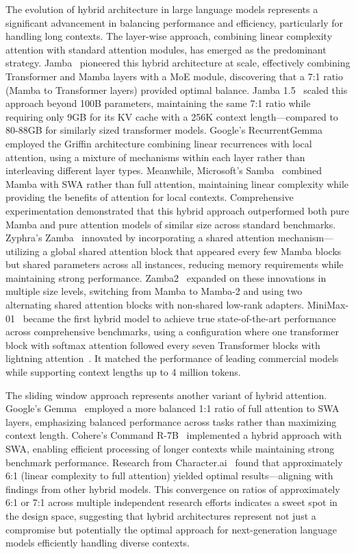 \documentclass[11pt, a4paper, logo, copyright, nonumbering]{map}
\begin{document}
The evolution of hybrid architecture in large language models represents a significant advancement in balancing performance and efficiency, particularly for handling long contexts. The layer-wise approach, combining linear complexity attention with standard attention modules, has emerged as the predominant strategy. Jamba~\cite{lieber2024jamba} pioneered this hybrid architecture at scale, effectively combining Transformer and Mamba layers with a MoE module, discovering that a 7:1 ratio (Mamba to Transformer layers) provided optimal balance. Jamba 1.5~\cite{team2024jamba} scaled this approach beyond 100B parameters, maintaining the same 7:1 ratio while requiring only 9GB for its KV cache with a 256K context length—compared to 80-88GB for similarly sized transformer models.
Google's RecurrentGemma~\cite{recurrentgemma} employed the Griffin architecture combining linear recurrences with local attention, using a mixture of mechanisms within each layer rather than interleaving different layer types. Meanwhile, Microsoft's Samba~\cite{ren2024sambasimplehybridstate} combined Mamba with SWA rather than full attention, maintaining linear complexity while providing the benefits of attention for local contexts. Comprehensive experimentation demonstrated that this hybrid approach outperformed both pure Mamba and pure attention models of similar size across standard benchmarks.
Zyphra's Zamba~\cite{glorioso2024zamba} innovated by incorporating a shared attention mechanism—utilizing a global shared attention block that appeared every few Mamba blocks but shared parameters across all instances, reducing memory requirements while maintaining strong performance. Zamba2~\cite{glorioso2024zamba2} expanded on these innovations in multiple size levels, switching from Mamba to Mamba-2 and using two alternating shared attention blocks with non-shared low-rank adapters.
MiniMax-01~\cite{minimax2025minimax01scalingfoundationmodels} became the first hybrid model to achieve true state-of-the-art performance across comprehensive benchmarks, using a configuration where one transformer block with softmax attention followed every seven Transformer blocks with lightning attention~\citep{qin2024variouslengthsconstantspeed}. It matched the performance of leading commercial models while supporting context lengths up to 4 million tokens.

The sliding window approach represents another variant of hybrid attention. Google's Gemma~\cite{team2024gemma} employed a more balanced 1:1 ratio of full attention to SWA layers, emphasizing balanced performance across tasks rather than maximizing context length. Cohere's Command R-7B~\cite{c4ai-command-r7b-12-2024} implemented a hybrid approach with SWA, enabling efficient processing of longer contexts while maintaining strong benchmark performance. Research from Character.ai~\cite{character_ai} found that approximately 6:1 (linear complexity to full attention) yielded optimal results—aligning with findings from other hybrid models. This convergence on ratios of approximately 6:1 or 7:1 across multiple independent research efforts indicates a sweet spot in the design space, suggesting that hybrid architectures represent not just a compromise but potentially the optimal approach for next-generation language models efficiently handling diverse contexts.
\end{document}
